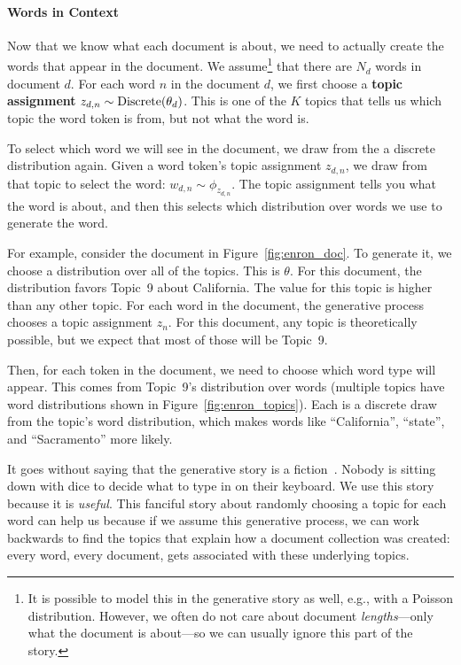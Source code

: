 \paragraph{Words in Context}

Now that we know what each document is about, we need to actually create the
words that appear in the document.  We assume\footnote{It is possible to model
  this in the generative story as well, e.g., with a Poisson distribution.
  However, we often do not care about document \emph{lengths}---only what the
  document is about---so we can usually ignore this part of the story.} that
there are $N_d$ words in document $d$.  For each word $n$ in the
document $d$, we first choose a {\bf topic assignment} $z_{d,n} \sim
\mbox{Discrete}( \theta_d)$.  This is one of the $K$ topics that tells us which topic the
word token is from, but not what the word is.

To select which word we will see in the document, we draw from the a discrete
distribution again.  Given a word token's topic assignment $z_{d,n}$, we draw from that
topic to select the word: $w_{d,n} \sim \phi_{z_{d,n}}$.  The topic assignment
tells you what the word is about, and then this selects which distribution over
words we use to generate the word.  %

For example, consider the document in Figure~\ref{fig:enron_doc}.  To
generate it, we choose a distribution over all of the topics.  This is
$\theta$.  For this document, the distribution favors Topic~9 about
California.  The value for this topic is higher than any other topic.  For
each word in the document, the generative process chooses a topic
assignment $z_n$.  For this document, any topic is theoretically possible, but we expect that most of those will be Topic~9.

Then, for each token in the document, we need to choose which word type will appear.  This
comes from Topic~9's distribution over words (multiple topics have
word distributions shown in Figure~\ref{fig:enron_topics}).  Each is a
discrete draw from the topic's word distribution, which makes words
like ``California'', ``state'', and ``Sacramento'' more likely.

It goes without saying that the generative story is a fiction~\citep{box-87}.
Nobody is sitting down with dice to decide what to type in on their keyboard.
We use this story because it is \emph{useful}.  This fanciful story about randomly
choosing a topic for each word can help us because if we assume this generative
process, we can work backwards to find the topics that explain how a document
collection was created: every word, every document, gets associated with these
underlying topics.

